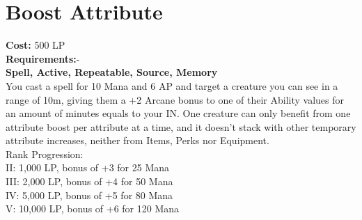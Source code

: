 \section{Boost Attribute}\label{spell:boostAttribute}
\textbf{Cost:} 500 LP\\
\textbf{Requirements:}-\\
\textbf{Spell, Active, Repeatable, Source, Memory}\\
You cast a spell for 10 Mana and 6 AP and target a creature you can see in a range of 10m, giving them a +2 Arcane bonus to one of their Ability values for an amount of minutes equals to your IN.
One creature can only benefit from one attribute boost per attribute at a time, and it doesn't stack with other temporary attribute increases, neither from Items, Perks nor Equipment.
\\
Rank Progression:\\
II: 1,000 LP, bonus of +3 for 25 Mana\\
III: 2,000 LP, bonus of +4 for 50 Mana\\
IV: 5,000 LP, bonus of +5 for 80 Mana\\
V: 10,000 LP, bonus of +6 for 120 Mana\\
